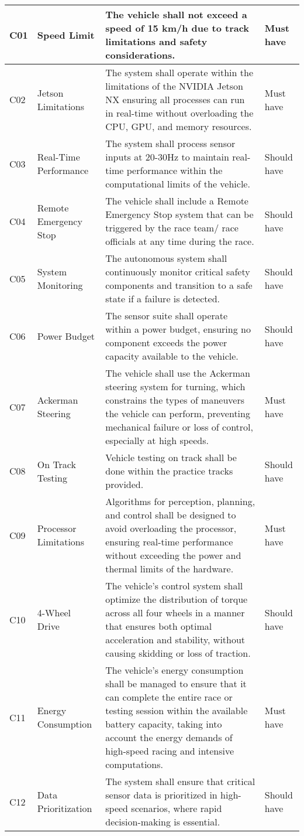 \begin{center}
\begin{longtable}{ | m{2em} | m{10em} | m{16em} | m{8em} | }
		C01 & Speed Limit & The vehicle shall not exceed a speed of 15 km/h due to track limitations and safety considerations. & Must have \\
		\hline
		C02 & Jetson Limitations & The system shall operate within the limitations of the NVIDIA Jetson NX ensuring all processes can run in real-time without overloading the CPU, GPU, and memory resources. & Must have \\
		\hline
		C03 & Real-Time Performance & The system shall process sensor inputs at 20-30Hz to maintain real-time performance within the computational limits of the vehicle. & Should have \\
		\hline
		C04 & Remote Emergency Stop & The vehicle shall include a Remote Emergency Stop system that can be triggered by the race team/ race officials at any time during the race. & Should have \\
		\hline
		C05 & System Monitoring & The autonomous system shall continuously monitor critical safety components and transition to a safe state if a failure is detected. & Should have \\
		\hline
		C06 & Power Budget & The sensor suite shall operate within a power budget, ensuring no component exceeds the power capacity available to the vehicle. & Should have \\
		\hline
		C07 & Ackerman Steering & The vehicle shall use the Ackerman steering system for turning, which constrains the types of maneuvers the vehicle can perform, preventing mechanical failure or loss of control, especially at high speeds. & Must have \\
		\hline
		C08 & On Track Testing & Vehicle testing on track shall be done within the practice tracks provided. & Should have \\
		\hline
		C09 & Processor Limitations & Algorithms for perception, planning, and control shall be designed to avoid overloading the processor, ensuring real-time performance without exceeding the power and thermal limits of the hardware. & Must have \\
		\hline
		C10 & 4-Wheel Drive & The vehicle's control system shall optimize the distribution of torque across all four wheels in a manner that ensures both optimal acceleration and stability, without causing skidding or loss of traction. & Should have \\
		\hline
		C11 & Energy Consumption & The vehicle's energy consumption shall be managed to ensure that it can complete the entire race or testing session within the available battery capacity, taking into account the energy demands of high-speed racing and intensive computations. & Must have \\
		\hline
		C12 & Data Prioritization & The system shall ensure that critical sensor data is prioritized in high-speed scenarios, where rapid decision-making is essential. & Should have \\
		\hline
		
	\end{longtable}
\end{center}


